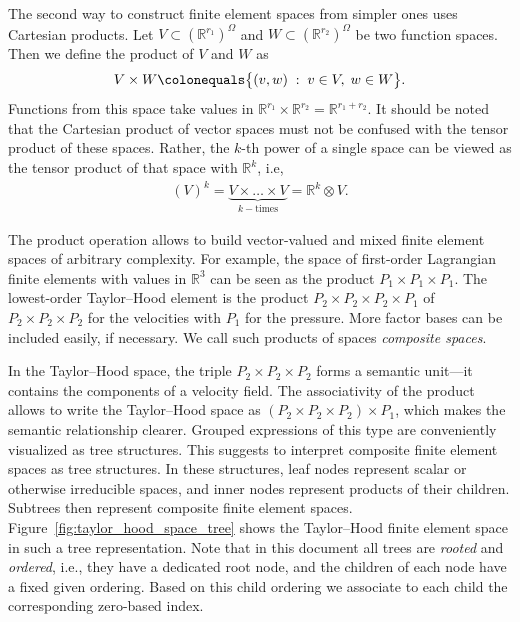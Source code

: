 \documentclass[a4paper,10pt,headings=normal,bibliography=totoc]{scrartcl}
\newcommand{\R}{\mathbb{R}}
\newcommand{\st}{\; : \;}
\begin{document}
The second way to construct finite element spaces from simpler ones uses Cartesian products.
Let $V \subset (\R^{r_1})^\Omega$ and $W \subset (\R^{r_2})^\Omega$ be two function spaces.
Then we define the product of $V$ and $W$ as
\begin{align*}
  V \times W
    \colonequals \big\{ (v,w) \st v \in V, \; w \in W \big\}.
\end{align*}
Functions from this space take values in $\R^{r_1} \times \R^{r_2} = \R^{r_1 + r_2}$.
It should be noted that the Cartesian product of
vector spaces must not be confused with the tensor product of these spaces.
Rather, the $k$-th power
of a single space can be viewed as the tensor product of that space with $\R^k$, i.e,
\begin{align*}
    (V)^k
    = \underbrace{V \times \dots \times V}_{k-\text{times}}
    = \R^k \otimes V.
\end{align*}

The product operation allows to build vector-valued and mixed finite element spaces of arbitrary complexity.
For example, the space of
first-order Lagrangian finite elements with values in $\R^3$ can be seen as the product $P_1 \times P_1 \times P_1$.
The lowest-order Taylor--Hood element is the product $P_2 \times P_2 \times P_2 \times P_1$
of $P_2 \times P_2 \times P_2$ for the velocities with $P_1$ for the pressure.
More factor bases can be included easily, if necessary.  We call such products of
spaces \emph{composite spaces}.

In the Taylor--Hood space, the triple
$P_2 \times P_2 \times P_2$ forms a semantic unit---it contains the components of a velocity field.
The associativity of the product allows to write the Taylor--Hood space
as $(P_2 \times P_2 \times P_2) \times P_1$, which makes the semantic relationship clearer.
Grouped expressions of this type are conveniently visualized as tree structures.  This
suggests to interpret composite
finite element spaces as tree structures.  In these structures, leaf nodes represent scalar or otherwise irreducible spaces,
and inner nodes represent products of their children.  Subtrees then represent composite
finite element spaces.  Figure~\ref{fig:taylor_hood_space_tree} shows the Taylor--Hood finite element
space in such a tree representation. Note that in this document all trees are \emph{rooted} and \emph{ordered},
i.e., they have a dedicated root node, and the children of each node have a fixed given ordering.
Based on this child ordering we associate to each child the corresponding zero-based index.
\end{document}
